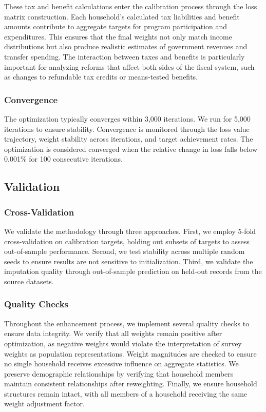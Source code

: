 These tax and benefit calculations enter the calibration process through the loss matrix construction. Each household's calculated tax liabilities and benefit amounts contribute to aggregate targets for program participation and expenditures. This ensures that the final weights not only match income distributions but also produce realistic estimates of government revenues and transfer spending. The interaction between taxes and benefits is particularly important for analyzing reforms that affect both sides of the fiscal system, such as changes to refundable tax credits or means-tested benefits.

\subsubsection{Convergence}

The optimization typically converges within 3,000 iterations. We run for 5,000 iterations to ensure stability. Convergence is monitored through the loss value trajectory, weight stability across iterations, and target achievement rates. The optimization is considered converged when the relative change in loss falls below 0.001\% for 100 consecutive iterations.

\subsection{Validation}

\subsubsection{Cross-Validation}

We validate the methodology through three approaches. First, we employ 5-fold cross-validation on calibration targets, holding out subsets of targets to assess out-of-sample performance. Second, we test stability across multiple random seeds to ensure results are not sensitive to initialization. Third, we validate the imputation quality through out-of-sample prediction on held-out records from the source datasets.

\subsubsection{Quality Checks}

Throughout the enhancement process, we implement several quality checks to ensure data integrity. We verify that all weights remain positive after optimization, as negative weights would violate the interpretation of survey weights as population representations. Weight magnitudes are checked to ensure no single household receives excessive influence on aggregate statistics. We preserve demographic relationships by verifying that household members maintain consistent relationships after reweighting. Finally, we ensure household structures remain intact, with all members of a household receiving the same weight adjustment factor.

